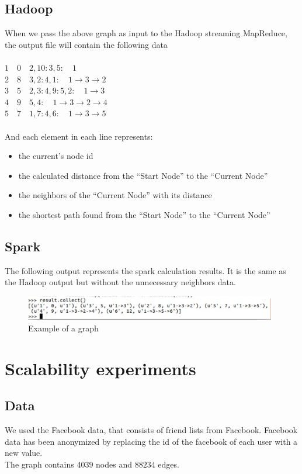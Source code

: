\documentclass[english]{article}
\begin{document}
\subsection{Hadoop}
When we pass the above graph as input to the Hadoop streaming MapReduce, the output file will contain the following data\\
$ $\\
$ 1\quad  0\quad 2,10:3,5:\quad 1$\\
$ 2 \quad 8\quad 3,2:4,1: \quad1\rightarrow3\rightarrow2$\\	
$ 3\quad  5 \quad2,3:4,9:5,2: \quad1\rightarrow3$\\	
$ 4 \quad 9 \quad5,4: \quad 1\rightarrow3\rightarrow2\rightarrow4$\\	
$ 5 \quad 7 \quad1,7:4,6: \quad1\rightarrow3\rightarrow5$\\
$ $\\
And each element in each line represents:
\begin{itemize}
\item the current’s node id
\item the calculated distance from the “Start Node” to the “Current Node”
\item the neighbors of the “Current Node” with its distance
\item the shortest path found from the “Start Node” to the “Current Node”
\end{itemize}

\subsection{Spark}
The following output represents the spark calculation results. It is the same as the Hadoop output but without the unnecessary neighbors data.\\
\begin{figure}[h]
\centering
\includegraphics[width=11cm]{img/spark.png}
\caption{Example of a graph}
\end{figure}

\section{Scalability experiments}
\subsection{Data}
We used the Facebook data, that consists of friend lists from Facebook. Facebook data has been anonymized by replacing the id of the facebook of each user with a new value.\\
The graph contains $4039$ nodes and $88234$ edges. \\
\end{document}
